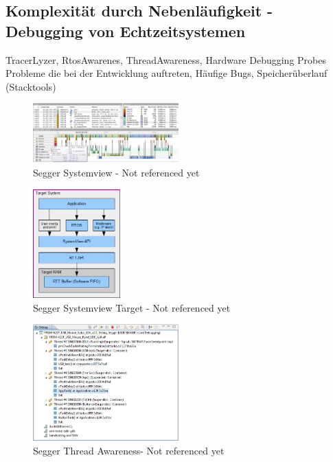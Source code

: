 \subsection{Komplexität durch Nebenläufigkeit - Debugging von Echtzeitsystemen}
\label{sec:Debugging von Echtzeitsystemen}
TracerLyzer, RtosAwarenes, ThreadAwareness, Hardware Debugging Probes 
Probleme die bei der Entwicklung auftreten, Häufige Bugs, Speicherüberlauf (Stacktools)
\begin{figure}[ht!]
	\centering
		\includegraphics[width=0.5\textwidth]{Pictures/Segger/systemview.png}
	\caption{Segger Systemview - Not referenced yet}
	\label{fig:Systemview}
\end{figure}
\begin{figure}[ht!]
	\centering
		\includegraphics[width=0.3\textwidth]{Pictures/Segger/SystemViewTarget.png}
	\caption{Segger Systemview Target - Not referenced yet}
	\label{fig:SystemviewTarget}
\end{figure}
\begin{figure}[ht!]
	\centering
		\includegraphics[width=0.5\textwidth]{Pictures/Segger/freertosThreadAwareness}
	\caption{Segger Thread Awareness- Not referenced yet}
	\label{fig:ThreadAware}
\end{figure}